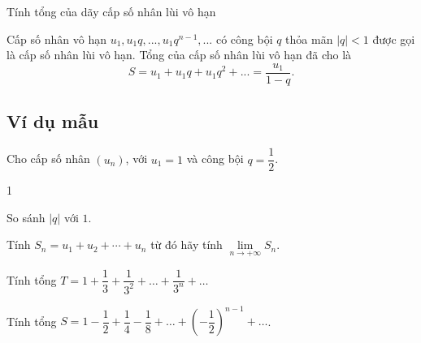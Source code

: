 

\begin{dang}{Tính tổng của dãy cấp số nhân lùi vô hạn}
		\begin{dn}
		Cấp số nhân vô hạn $u_1, u_1q,...,u_1q^{n-1},...$ có công bội $q$ thỏa mãn $|q|<1$ được gọi là cấp số nhân lùi vô hạn. 
		Tổng của cấp số nhân lùi vô hạn đã cho là $$S=u_1+u_1q+u_1q^2+...=\dfrac{u_1}{1-q}.$$
	\end{dn}
\end{dang}
\subsection*{Ví dụ mẫu}
\begin{vd}%
	Cho cấp số nhân $(u_n)$, với $u_1=1$ và công bội $q=\dfrac{1}{2}$.
	\begin{enumEX}{1}
		\item So sánh $\left|q\right|$ với $1$.
		\item Tính $S_n=u_1+u_2+\cdots+u_n$ từ đó hãy tính $\lim \limits_{n \to +\infty}S_n$.
	\end{enumEX}
\end{vd}
\begin{vd}%
	Tính tổng $T=1+\dfrac{1}{3}+\dfrac{1}{3^2}+\ldots+\dfrac{1}{3^n}+\ldots$
\end{vd}
\begin{vd}
	Tính tổng $S=1-\dfrac{1}{2}+\dfrac{1}{4}-\dfrac{1}{8}+\ldots+\left(-\dfrac{1}{2}\right)^{n-1}+\ldots$.
\end{vd}

